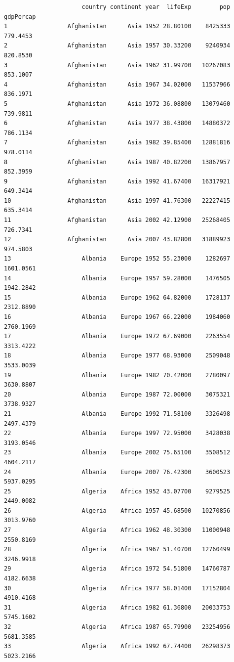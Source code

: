 \documentclass[
  letterpaper,
  DIV=11,
  numbers=noendperiod]{scrreprt}
\begin{document}
\begin{verbatim}
                      country continent year  lifeExp        pop   gdpPercap
1                 Afghanistan      Asia 1952 28.80100    8425333    779.4453
2                 Afghanistan      Asia 1957 30.33200    9240934    820.8530
3                 Afghanistan      Asia 1962 31.99700   10267083    853.1007
4                 Afghanistan      Asia 1967 34.02000   11537966    836.1971
5                 Afghanistan      Asia 1972 36.08800   13079460    739.9811
6                 Afghanistan      Asia 1977 38.43800   14880372    786.1134
7                 Afghanistan      Asia 1982 39.85400   12881816    978.0114
8                 Afghanistan      Asia 1987 40.82200   13867957    852.3959
9                 Afghanistan      Asia 1992 41.67400   16317921    649.3414
10                Afghanistan      Asia 1997 41.76300   22227415    635.3414
11                Afghanistan      Asia 2002 42.12900   25268405    726.7341
12                Afghanistan      Asia 2007 43.82800   31889923    974.5803
13                    Albania    Europe 1952 55.23000    1282697   1601.0561
14                    Albania    Europe 1957 59.28000    1476505   1942.2842
15                    Albania    Europe 1962 64.82000    1728137   2312.8890
16                    Albania    Europe 1967 66.22000    1984060   2760.1969
17                    Albania    Europe 1972 67.69000    2263554   3313.4222
18                    Albania    Europe 1977 68.93000    2509048   3533.0039
19                    Albania    Europe 1982 70.42000    2780097   3630.8807
20                    Albania    Europe 1987 72.00000    3075321   3738.9327
21                    Albania    Europe 1992 71.58100    3326498   2497.4379
22                    Albania    Europe 1997 72.95000    3428038   3193.0546
23                    Albania    Europe 2002 75.65100    3508512   4604.2117
24                    Albania    Europe 2007 76.42300    3600523   5937.0295
25                    Algeria    Africa 1952 43.07700    9279525   2449.0082
26                    Algeria    Africa 1957 45.68500   10270856   3013.9760
27                    Algeria    Africa 1962 48.30300   11000948   2550.8169
28                    Algeria    Africa 1967 51.40700   12760499   3246.9918
29                    Algeria    Africa 1972 54.51800   14760787   4182.6638
30                    Algeria    Africa 1977 58.01400   17152804   4910.4168
31                    Algeria    Africa 1982 61.36800   20033753   5745.1602
32                    Algeria    Africa 1987 65.79900   23254956   5681.3585
33                    Algeria    Africa 1992 67.74400   26298373   5023.2166

\end{verbatim}
\end{document}

